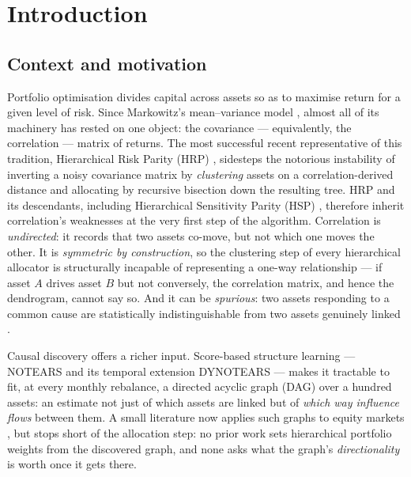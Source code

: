 \chapter{Introduction}
\label{chap:intro}

\section{Context and motivation}
\label{sec:motivation}

Portfolio optimisation divides capital across assets so as to maximise return
for a given level of risk. Since Markowitz's mean--variance model
\cite{markowitz1952portfolio}, almost all of its machinery has rested on one
object: the covariance --- equivalently, the correlation --- matrix of returns.
The most successful recent representative of this tradition, Hierarchical Risk
Parity (HRP) \cite{lopezdeprado2016hrp}, sidesteps the notorious instability of
inverting a noisy covariance matrix by \emph{clustering} assets on a
correlation-derived distance and allocating by recursive bisection down the
resulting tree. HRP and its descendants, including Hierarchical Sensitivity
Parity (HSP) \cite{rodriguez2023hsp}, therefore inherit correlation's
weaknesses at the very first step of the algorithm. Correlation is
\emph{undirected}: it records that two assets co-move, but not which one moves
the other. It is \emph{symmetric by construction}, so the clustering step of
every hierarchical allocator is structurally incapable of representing a
one-way relationship --- if asset $A$ drives asset $B$ but not conversely,
the correlation matrix, and hence the dendrogram, cannot say so. And it can be
\emph{spurious}: two assets responding to a common cause are statistically
indistinguishable from two assets genuinely linked \cite{simon1954spurious,
lopezdeprado2023causal}.

Causal discovery offers a richer input. Score-based structure learning ---
NOTEARS \cite{zheng2018notears} and its temporal extension DYNOTEARS
\cite{pamfil2020dynotears} --- makes it tractable to fit, at every monthly
rebalance, a directed acyclic graph (DAG) over a hundred assets: an estimate
not just of which assets are linked but of \emph{which way influence flows}
between them. A small literature now applies such graphs to equity markets
\cite{howard2025causal,tang2024trading}, but stops short of the allocation
step: no prior work sets hierarchical portfolio weights from the discovered
graph, and none asks what the graph's \emph{directionality} is worth once it
gets there.

